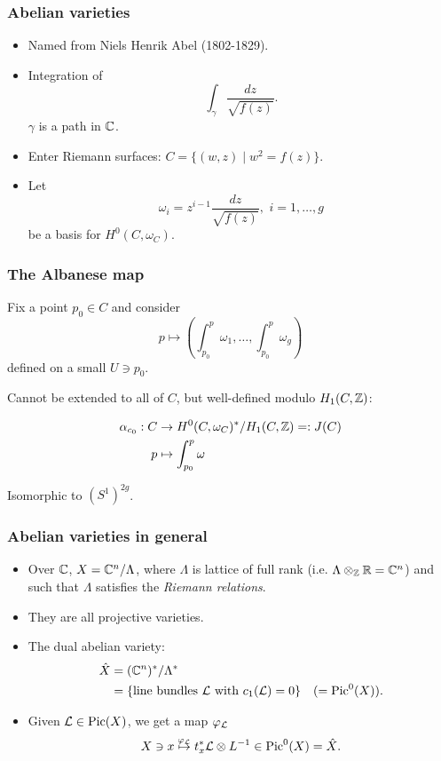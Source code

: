 \begin{frame}
\frametitle{Abelian varieties}

\begin{itemize}
	\item Named from Niels Henrik Abel (1802-1829).
	\item Integration of
	 \[
	\int_\gamma \frac{dz}{\sqrt{f(z)}}.
	\]
	$\gamma$ is a path in $\mathbb{C}$. \pause
	\item Enter Riemann surfaces: $C=\{ (w,z) \mid w^2=f(z) \}$.
	\item Let 
	\[
	\omega_i = z^{i-1} \frac{dz}{\sqrt{f(z)}}, \, \, i=1,\ldots,g
	\]
	be a basis for $H^0(C,\omega_C)$.
\end{itemize}

\end{frame}


\begin{frame}
\frametitle{The Albanese map}

Fix a point $p_0 \in C$ and consider
\[
p \mapsto \left(
\int_{p_0}^p \omega_1, \ldots,  \int_{p_0}^p \omega_g
\right)
\]
defined on a small $U \ni p_0$.
\pause

Cannot be extended to all of $C$, but well-defined modulo $H_1(C,\mathbb{Z})$:

\begin{align*}
\alpha_{c_0}:C &\to H^0(C,\omega_C)^\ast/ H_1(C,\mathbb{Z}) =: J(C) \\
p &\mapsto \int_{p_0}^p \omega
\end{align*}

Isomorphic to $(S^1)^{2g}$.
\end{frame}

\begin{frame}
\frametitle{Abelian varieties in general}

\begin{itemize}
	\item Over $\mathbb{C}$, $X=\mathbb{C}^n/\Lambda$, where $\Lambda$ is lattice of full rank (i.e. $\Lambda \otimes_{\mathbb{Z}} \mathbb{R} = \mathbb{C}^n$) and such that $\Lambda$ satisfies the \emph{Riemann relations}.
	\item They are all projective varieties.
	\item The \alert{dual abelian variety}:
	\begin{align*}
	\hat X &= (\mathbb{C}^n)^\ast/ \Lambda ^\ast \\
	&=\{ \text{line bundles $\mathcal{L}$ with $c_1(\mathcal{L})=0$} \} &(= \operatorname{Pic}^0(X)).
	\end{align*}
	\pause
	\item Given $\mathcal{L} \in \operatorname{Pic}(X)$, we get a map $\varphi_{\mathcal{L}}$
	\[
	X \ni x \stackrel{\varphi_{\mathcal{L}}}{\mapsto} t_x^\ast \mathcal{L} \otimes L^{-1} \in \operatorname{Pic}^0(X) = \hat X.
	\]
\end{itemize}

\end{frame}

